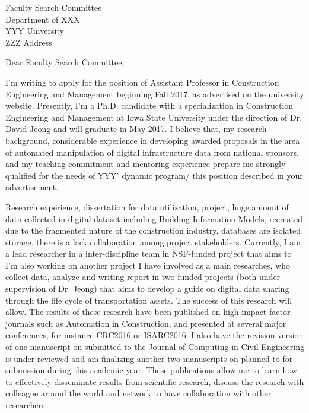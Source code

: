 \documentclass{letter}
\begin{document}
\address{Tuyen T. Le\\ 126 Beedle Drive, Unit 308\\Ames, IA 50014\\(515)-203-5273; \href{mailto:ttle@iastate.edu}{ttle@iastate.edu}}
\begin{letter} {Faculty Search Committee\\
Department of XXX\\
YYY University\\
ZZZ Address}

\opening{Dear Faculty Search Committee,}
I'm writing to apply for the position of Assistant Professor in Construction Engineering and Management beginning Fall 2017, as advertised on the university website.
%
Presently, I'm a Ph.D. candidate with a specialization in Construction Engineering and Management at Iowa State University under the direction of Dr. David Jeong and will graduate in May 2017.
%
%
I believe that, my research background, considerable experience in developing awarded proposals in the area of automated manipulation of digital infrastructure data from national sponsors, and my teaching commitment and mentoring experience prepare me strongly qualified for the needs of YYY' dynamic program/ this position described in your advertisement.


%
Research experience, dissertation for data utilization, project, huge amount of data collected in digital dataset including Building Information Models, recreated due to the fragmented nature of the construction industry, databases are isolated storage, there is a lack collaboration among project stakeholders. 
%
%
Currently, I am a lead researcher in a inter-discipline team in NSF-funded project that aims to
%
I'm also working on another project I have involved as a main researches, who collect data, analyze and writing report in two funded projects (both under supervision of Dr. Jeong) that aims to develop a guide on digital data sharing through the life cycle of transportation assets. The success of this research will allow. 
The results of these research have been published on high-impact factor journals such as Automation in Construction, and presented at several major conferences, for instance CRC2016 or ISARC2016. I also have the revision version of one manuscript on submitted to the Journal of Computing in Civil Engineering is under reviewed and am finalizing another two manuscripts on planned to for submission during this academic year. 
%
These publications allow me to learn how to effectively disseminate results from scientific research, discuss the research with colleague around the world and network to have collaboration with other researchers.


\end{letter}
\end{document}
